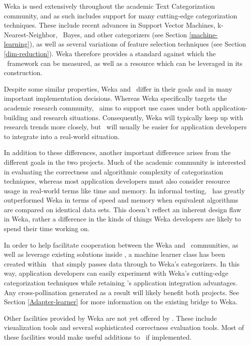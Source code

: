 Weka is used extensively throughout the academic Text Categorization
community, and as such includes support for many cutting-edge
categorization techniques.  These include recent advances in Support Vector
Machines, k-Nearest-Neighbor, \naive\ Bayes, and other categorizers
(see Section \ref{machine-learning}), as well as several variations of
feature selection techniques (see Section \ref{dim-reduction}).  Weka
therefore provides a standard against which the \aicat\ framework can
be measured, as well as a resource which can be leveraged in its
construction.

Despite some similar properties, Weka and \aicat\ differ in
their goals and in many important implementation decisions.  Whereas
Weka specifically targets the academic research community,
\aicat\ aims to support use cases under both
application-building and research situations.
Consequently, Weka will typically keep up with research trends more
closely, but \aicat\ will usually be easier for application
developers to integrate into a real-world situation.

In addition to these differences, another important difference arises
from the different goals in the two projects.  Much of the academic
community is interested in evaluating the correctness and algorithmic
complexity of categorization techniques, whereas most application
developers must also consider resource usage in real-world terms like
time and memory.  In informal testing, \aicat\ has greatly outperformed
Weka in terms of speed and memory when equivalent algorithms are
compared on identical data sets.  This doesn't reflect an inherent
design flaw in Weka, rather a difference in the kinds of things Weka
developers are likely to spend their time working on.

In order to help facilitate cooperation between the Weka and
\aicat\ communities, as well as leverage existing solutions
inside \aicat, a machine learner class has been created
within \aicat\ that simply passes data through to Weka's
categorizers.  In this way, application developers can easily
experiment with Weka's cutting-edge categorization techniques while
retaining \aicat's application integration advantages.  Any
cross-pollination generated as a result will likely benefit both
projects.  See Section \ref{Adapter-learner} for more information on
the existing bridge to Weka.

Other facilities provided by Weka are not yet offered by
\aicat.  These include visualization tools and several
sophisticated correctness evaluation tools.  Most of these
facilities would make useful additions to \aicat\ if
implemented.

